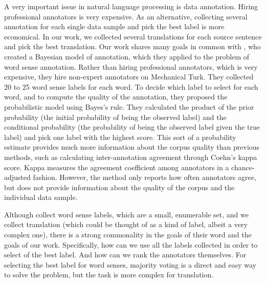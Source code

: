 \documentclass[11pt]{article}
\begin{document}

A very important issue in natural language processing is data annotation. Hiring professional annotators is very expensive. As an alternative, collecting several annotation for each single data sample and pick the best label is  more economical.  In our work, we collected several translations for each source sentence and pick the best translation. Our work shares many goals in common with , who created a Bayesian model of annotation, which they applied to the problem of word sense annotation. Rather than hiring professional annotators, which is very expensive, they hire non-expert annotators on Mechanical Turk.  They collected 20 to 25 word sense labels for each word. To decide which label to select for each word, and to compute the quality of the annotation, they proposed the probabilistic model using Bayes's rule. They calculated the product of the prior probability (the initial probability of being the observed label) and the conditional probability (the probability of being the observed label given the true label) and pick one label with the highest score. This sort of a probability estimate provides much more information about the corpus quality than previous methods, such as calculating inter-annotation agreement through Coehn's kappa score.  Kappa measures the agreement coefficient among annotators in a chance-adjusted fashion.  However, the method  only  reports how often annotators agree, but does not provide information about the quality of the corpus and the individual data sample.

Although  collect word sense labels, which are a small, enumerable set, and we collect translation (which could be thought of as a kind of label, albeit a very complex one), there is a strong commonality in the goals of their word and the goals of our work.  Specifically, how can we use all the labels collected in order to select of the best label.  And how can we rank the annotators themselves.  For selecting the best label for word senses, majority voting is a direct and easy way to solve the problem, but the task is more complex for translation. 
\end{document}
